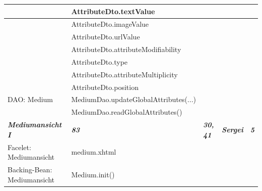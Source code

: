 \documentclass{article}
\begin{document}
\begin{longtable}{|l|l|l|l|l|}
\hline
                                        & AttributeDto.textValue                   &                           &                             &                        \\ 
\hline
                                        & AttributeDto.imageValue                  &                           &                             &                        \\ 
\hline
                                        & AttributeDto.urlValue                    &                           &                             &                        \\ 
\hline
                                        & AttributeDto.attributeModifiability      &                           &                             &                        \\ 
\hline
                                        & AttributeDto.type                        &                           &                             &                        \\ 
\hline
                                        & AttributeDto.attributeMultiplicity       &                           &                             &                        \\ 
\hline
                                        & AttributeDto.position                    &                           &                             &                        \\ 
\hline
DAO: Medium                             & MediumDao.updateGlobalAttributes(...)    &                           &                             &                        \\ 
\hline
                                        & MediumDao.readGlobalAttributes()         &                           &                             &                        \\ 
\hline
\textbf{\textit{Mediumansicht I}}       & \textbf{\textit{83}}                     & \textbf{\textit{30, 41}}  & \textbf{\textit{Sergei}}    & \textbf{\textit{5}}    \\ 
\hline
Facelet: Mediumansicht                  & medium.xhtml                             &                           &                             &                        \\ 
\hline
Backing-Bean: Mediumansicht             & Medium.init()                            &                           &                             &                        \\ 

\end{longtable}
\end{document}
